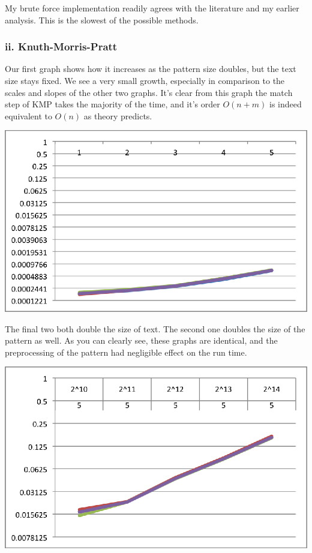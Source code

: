 \documentclass{chi2005}
\begin{document}
My brute force implementation readily agrees with the literature and my earlier analysis. This is the slowest of the possible methods.

\subsubsection{ii. Knuth-Morris-Pratt}

Our first graph shows how it increases as the pattern size doubles, but the text size stays fixed. We see a very small growth, especially in comparison to the scales and slopes of the other two graphs. It's clear from this graph the match step of KMP takes the majority of the time, and it's order $O(n+m)$ is indeed equivalent to $O(n)$ as theory predicts.

\includegraphics[scale=0.7]{KMPFixedM.eps}

The final two both double the size of text. The second one doubles the size of the pattern as well. As you can clearly see, these graphs are identical, and the preprocessing of the pattern had negligible effect on the run time.
 
\includegraphics[scale=0.7]{KMPFixedN.eps}
\end{document}
